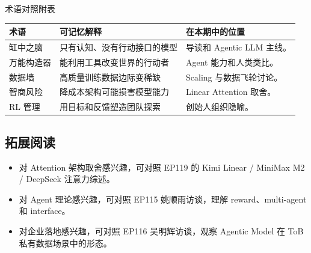 \begin{knowledgebox}{术语对照附表}
\begin{tabularx}{\textwidth}{p{}p{}X}
\toprule
术语 & 可记忆解释 & 在本期中的位置 \\
\midrule
缸中之脑 & 只有认知、没有行动接口的模型 & 导读和 Agentic LLM 主线。 \\
万能构造器 & 能利用工具改变世界的行动者 & Agent 能力和人类类比。 \\
数据墙 & 高质量训练数据边际变稀缺 & Scaling 与数据飞轮讨论。 \\
智商风险 & 降成本架构可能损害模型能力 & Linear Attention 取舍。 \\
RL 管理 & 用目标和反馈塑造团队探索 & 创始人组织隐喻。 \\
\bottomrule
\end{tabularx}
\end{knowledgebox}

\subsection{拓展阅读}

\begin{itemize}
\item 对 Attention 架构取舍感兴趣，可对照 EP119 的 Kimi Linear / MiniMax M2 / DeepSeek 注意力综述。
\item 对 Agent 理论感兴趣，可对照 EP115 姚顺雨访谈，理解 reward、multi-agent 和 interface。
\item 对企业落地感兴趣，可对照 EP116 吴明辉访谈，观察 Agentic Model 在 ToB 私有数据场景中的形态。
\end{itemize}


